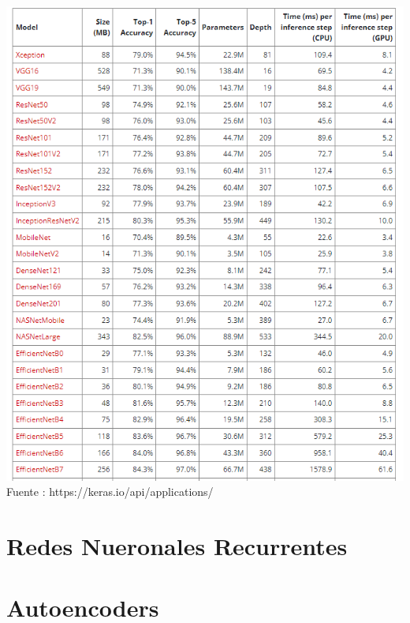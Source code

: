\documentclass[
  a4paper,
  DIV=11,
  numbers=noendperiod]{scrreprt}
\begin{document}
\includegraphics{imagenes/capitulo1/modelos_entrenados.png} Fuente :
https://keras.io/api/applications/

\hypertarget{redes-nueronales-recurrentes}{%
\section{Redes Nueronales
Recurrentes}\label{redes-nueronales-recurrentes}}

\hypertarget{autoencoders}{%
\section{Autoencoders}\label{autoencoders}}
\end{document}
